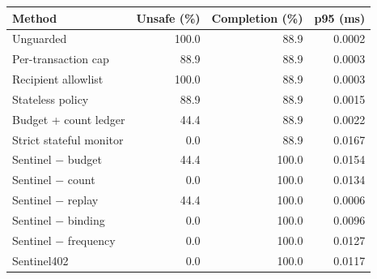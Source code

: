 \begin{tabular}{lrrr}
\hline
Method & Unsafe (\%) & Completion (\%) & p95 (ms) \\
\hline
Unguarded & 100.0 & 88.9 & 0.0002 \\
Per-transaction cap & 88.9 & 88.9 & 0.0003 \\
Recipient allowlist & 100.0 & 88.9 & 0.0003 \\
Stateless policy & 88.9 & 88.9 & 0.0015 \\
Budget + count ledger & 44.4 & 88.9 & 0.0022 \\
Strict stateful monitor & 0.0 & 88.9 & 0.0167 \\
Sentinel $-$ budget & 44.4 & 100.0 & 0.0154 \\
Sentinel $-$ count & 0.0 & 100.0 & 0.0134 \\
Sentinel $-$ replay & 44.4 & 100.0 & 0.0006 \\
Sentinel $-$ binding & 0.0 & 100.0 & 0.0096 \\
Sentinel $-$ frequency & 0.0 & 100.0 & 0.0127 \\
Sentinel402 & 0.0 & 100.0 & 0.0117 \\
\hline
\end{tabular}
